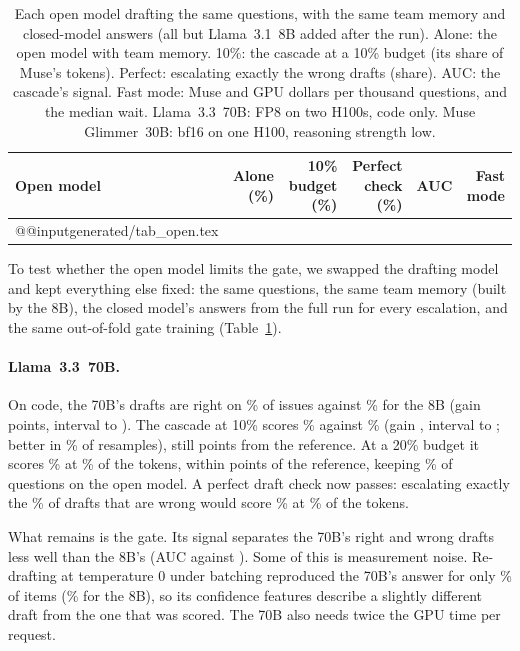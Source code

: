 \documentclass[10pt,twocolumn]{article}
\makeatletter
\newcommand{\rows}[1]{\csname @@input\endcsname generated/#1 }
\makeatother
\begin{document}
\begin{table}[t]
\centering
\small
\caption{Each open model drafting the same questions, with the same team memory and closed-model answers (all but Llama~3.1~8B added after the run). Alone: the open model with team memory. 10\%: the cascade at a 10\% budget (its share of Muse's tokens). Perfect: escalating exactly the wrong drafts (share). AUC: the cascade's signal. Fast mode: Muse and GPU dollars per thousand questions, and the median wait. Llama~3.3~70B: FP8 on two H100s, code only. Muse Glimmer~30B: bf16 on one H100, reasoning strength low.}
\label{tab:open}
\begin{tabular}{lrrrrr}
\toprule
Open model & Alone (\%) & 10\% budget (\%) & Perfect check (\%) & AUC & Fast mode\\
\midrule
\rows{tab_open.tex}
\bottomrule
\end{tabular}
\end{table}

To test whether the open model limits the gate, we swapped the drafting model and kept everything else fixed: the same questions, the same team memory (built by the 8B), the closed model's answers from the full run for every escalation, and the same out-of-fold gate training (Table~\ref{tab:open}).

\paragraph{Llama~3.3~70B.} On code, the 70B's drafts are right on \bigAlone\% of issues against \accSweLlama\% for the 8B (gain \gainAlone{} points, interval \gainAloneLo{} to \gainAloneHi). The cascade at 10\% scores \bigCascadeTen\% against \cascadeSwe\% (gain \gainCascade, interval \gainCascadeLo{} to \gainCascadeHi; better in \gainCascadeP\% of resamples), still \bigGapTen{} points from the reference. At a 20\% budget it scores \bigCascadeTwenty\% at \bigShareTwenty\% of the tokens, within \bigGapTwenty{} points of the reference, keeping \bigKeptTwenty\% of questions on the open model. A perfect draft check now passes: escalating exactly the \bigWrong\% of drafts that are wrong would score \bigPerfect\% at \bigPerfectShare\% of the tokens.

What remains is the gate. Its signal separates the 70B's right and wrong drafts less well than the 8B's (AUC \bigAuc{} against \aucCascadeSwe). Some of this is measurement noise. Re-drafting at temperature 0 under batching reproduced the 70B's answer for only \bigSame\% of items (\smallSame\% for the 8B), so its confidence features describe a slightly different draft from the one that was scored. The 70B also needs twice the GPU time per request.
\end{document}
